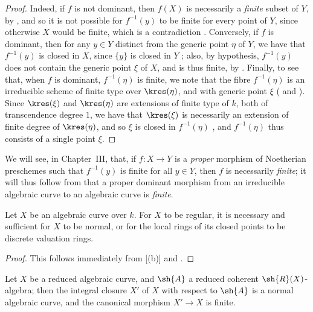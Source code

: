 \begin{proof}
Indeed, if $f$ is not dominant, then $f(X)$ is necessarily a \emph{finite} subset of $Y$, by , and so it is not possible for $f^{-1}(y)$ to be finite for every point of $Y$, since otherwise $X$ would be finite, which is a contradiction .
Conversely, if $f$ is dominant, then for any $y\in Y$ distinct from the generic point $\eta$ of $Y$, we have that $f^{-1}(y)$ is closed in $X$, since $\{y\}$ is closed in $Y$ ;
also, by hypothesis, $f^{-1}(y)$ does not contain the generic point $\xi$ of $X$, and is thus finite, by .
Finally, to see that, when $f$ is dominant, $f^{-1}(\eta)$ is finite, we note that the fibre $f^{-1}(\eta)$ is an irreducible scheme of finite type over $\kres(\eta)$, and with generic point $\xi$ ( and ).
Since $\kres(\xi)$ and $\kres(\eta)$ are extensions of finite type of $k$, both of transcendence degree $1$, we have that $\kres(\xi)$ is necessarily an extension of finite degree of $\kres(\eta)$, and so $\xi$ is closed in $f^{-1}(\eta)$ , and $f^{-1}(\eta)$ thus consists of a single point $\xi$.
\end{proof}

We will see, in Chapter~III, that, if $f:X\to Y$ is a \emph{proper} morphism of Noetherian preschemes such that $f^{-1}(y)$ is finite for all $y\in Y$, then $f$ is necessarily \emph{finite};
it will thus follow from  that a proper dominant morphism from an irreducible algebraic curve to an algebraic curve is \emph{finite}.

\begin{corollary}[7.4.5]
\label{II.7.4.5}
Let $X$ be an algebraic curve over $k$.
For $X$ to be regular, it is necessary and sufficient for $X$ to be normal, or for the local rings of its closed points to be discrete valuation rings.
\end{corollary}

\begin{proof}
This follows immediately from [(b)] and .
\end{proof}

\begin{corollary}[7.4.6]
\label{II.7.4.6}
Let $X$ be a reduced algebraic curve, and $\sh{A}$ a reduced coherent $\sh{R}(X)$-algebra;
then the integral closure $X'$ of $X$ with respect to $\sh{A}$  is a normal algebraic curve, and the canonical morphism $X'\to X$ is finite.
\end{corollary}

